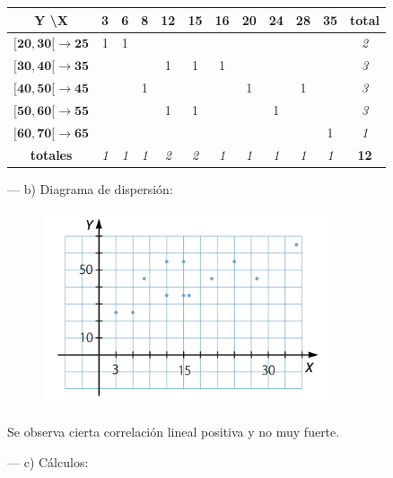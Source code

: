 \begin{table}[H]
\centering
\begin{tabular}{|c|c|c|c|c|c|c|c|c|c|c|c|}
\hline
\textbf{Y   \textbackslash   X} & \textbf{3} & \textbf{6} & \textbf{8} & \textbf{12} & \textbf{15} & \textbf{16} & \textbf{20} & \textbf{24} & \textbf{28} & \textbf{35} & \textbf{total} \\ \hline
\textbf{$\boldsymbol{[20,30[\to 25}$} & 1 & 1 &  &  &  &  &  &  &  &  & \textit{2} \\ \hline
\textbf{$\boldsymbol{[30,40[\to 35}$} &  &  &  & 1 & 1 & 1 &  &  &  &  & \textit{3} \\ \hline
\textbf{$\boldsymbol{[40,50[\to 45}$} &  &  & 1 &  &  &  & 1 &  & 1 &  & \textit{3} \\ \hline
\textbf{$\boldsymbol{[50,60[\to 55}$} &  &  &  & 1 & 1 &  &  & 1 &  &  & \textit{3} \\ \hline
\textbf{$\boldsymbol{[60,70[\to 65}$} &  &  &  &  &  &  &  &  &  & 1 & \textit{1} \\ \hline
\textbf{totales} & \textit{1} & \textit{1} & \textit{1} & \textit{2} & \textit{2} & \textit{1} & \textit{1} & \textit{1} & \textit{1} & \textit{1} & \textbf{12} \\ \hline
\end{tabular}
\end{table}

--- b) Diagrama de dispersión:

	\begin{figure}[H]
			\centering
			\includegraphics[width=0.75\textwidth]{imagenes/imagenes03/T03IM17.png}
	\end{figure}

Se observa cierta correlación lineal positiva y no muy fuerte.

--- c) Cálculos:

